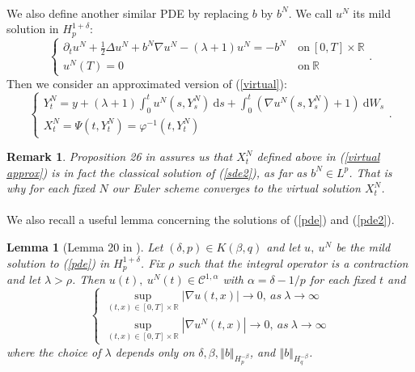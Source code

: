 \documentclass[12pt]{article}
\newtheorem{lem}[theo]{Lemma}
\newtheorem{rem}{Remark}
\newcommand{\norme}[1]{\left\Vert #1\right\Vert}
\newcommand{\R}{\mathbb{R}}
\newcommand{\di}{\mathrm{d}}
\begin{document}
        \paragraph{}
        We also define another similar PDE by replacing $b$ by $b^N$. We call $u^N$ its mild solution in $H_p^{1+\delta}$:
        \begin{equation}\label{pde2}
        \begin{cases}
        \partial_t u^N + \frac{1}{2}\Delta u^N + b^N\nabla u^N - (\lambda+1)u^N = -b^N\ &\mathrm{on}\ [0,T]\times\R\\
        u^N(T) = 0\ &\mathrm{on}\ \R
        \end{cases}.
        \end{equation}
        Then we consider an approximated version of (\ref{virtual}): \begin{equation}\label{virtual approx}
        \begin{cases}
        Y_t^N = y + (\lambda+1)\int_0^t u^N\left(s,Y_s^N\right)\ \di s +\int_0^t \left(\nabla u^N\left(s,Y_s^N\right)+1\right)\ \di W_s\\
        X_t^N = \Psi(t,Y_t^N) = \varphi^{-1}(t,Y_t^N)
        \end{cases}.
        \end{equation}
        
        \begin{rem}
            Proposition 26 in \cite{Fla-Iss-Rus-2017} assures us that $X^N_t$ defined above in (\ref{virtual approx}) is in fact the classical solution of (\ref{sde2}), as far as $b^N\in L^p$. That is why for each fixed $N$ our Euler scheme converges to the virtual solution $X^N_t$.
        \end{rem}
    
    \paragraph{}              
    We also recall a useful lemma concerning the solutions of (\ref{pde}) and (\ref{pde2}).
    
    \begin{lem}[Lemma 20 in \cite{Fla-Iss-Rus-2017}]\label{lem}
        Let $(\delta,p)\in K(\beta,q)$ and let $u,\ u^N$ be the mild solution to (\ref{pde}) in $H_p^{1+\delta}$. Fix $\rho$ such that the integral operator is a contraction and let $\lambda>\rho$. Then $u(t),\ u^N(t)\in\mathcal{C}^{1,\alpha}$ with $\alpha=\delta-1/p$ for each fixed $t$ and 
        \begin{equation*}
        \begin{cases}
        \underset{(t,x)\in[0,T]\times\R}{\sup} |\nabla u(t,x)| \rightarrow 0,\ as\ \lambda \rightarrow \infty \\
        \underset{(t,x)\in[0,T]\times\R}{\sup} |\nabla u^N(t,x)| \rightarrow 0,\ as\ \lambda \rightarrow \infty
        \end{cases}
        \end{equation*}
        where the choice of $\lambda$ depends only on $\delta,\beta,\norme{b}_{H_p^{-\beta}}$, and $\norme{b}_{H_q^{-\beta}}$.
    \end{lem}
    
\end{document}
